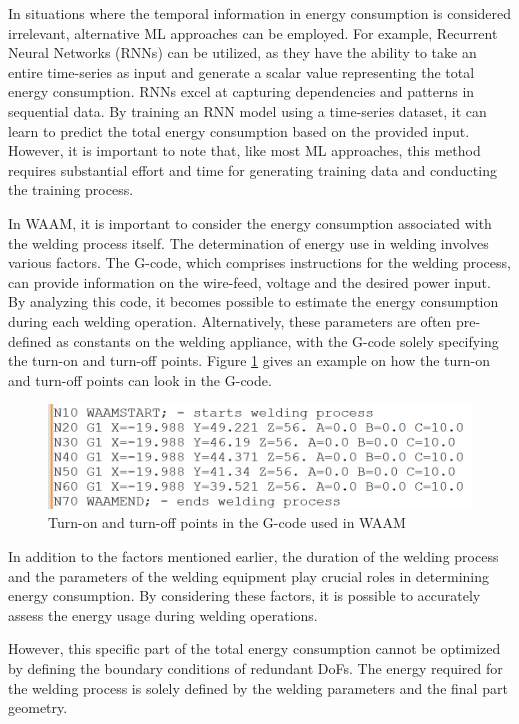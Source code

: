 In situations where the temporal information in energy consumption is considered irrelevant, alternative \acrshort{ML} approaches can be employed. For example, Recurrent Neural Networks (\acrshort{RNN}s) can be utilized, as they have the ability to take an entire time-series as input and generate a scalar value representing the total energy consumption. \acrshort{RNN}s excel at capturing dependencies and patterns in sequential data. By training an \acrshort{RNN} model using a time-series dataset, it can learn to predict the total energy consumption based on the provided input. However, it is important to note that, like most \acrshort{ML} approaches, this method requires substantial effort and time for generating training data and conducting the training process.

In \acrshort{WAAM}, it is important to consider the energy consumption associated with the welding process itself. The determination of energy use in welding involves various factors. The G-code, which comprises instructions for the welding process, can provide information on the wire-feed, voltage and the desired power input. By analyzing this code, it becomes possible to estimate the energy consumption during each welding operation. Alternatively, these parameters are often pre-defined as constants on the welding appliance, with the G-code solely specifying the turn-on and turn-off points. Figure \ref{waamgcode} gives an example on how the turn-on and turn-off points can look in the G-code.
 
\begin{figure}[H]
	\centerline{\includegraphics[width=.75\textwidth]{figures/waamgcode.png}}
	\caption{Turn-on and turn-off points in the G-code used in WAAM}
	\label{waamgcode}
\end{figure}

In addition to the factors mentioned earlier, the duration of the welding process and the parameters of the welding equipment play crucial roles in determining energy consumption. By considering these factors, it is possible to accurately assess the energy usage during welding operations.

However, this specific part of the total energy consumption cannot be optimized by defining the boundary conditions of redundant \acrshort{DoF}s. The energy required for the welding process is solely defined by the welding parameters and the final part geometry.

